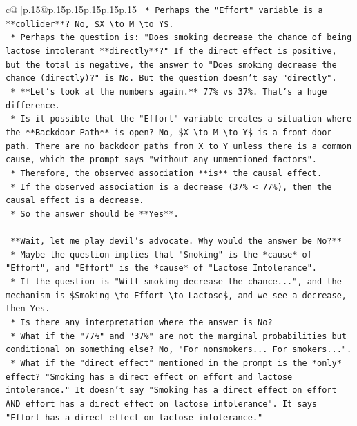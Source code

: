 \documentclass{article}
\begin{document}
{\begin{supertabular}{c@{$\;$}|p{.15\linewidth}@{}p{.15\linewidth}p{.15\linewidth}p{.15\linewidth}p{.15\linewidth}p{.15\linewidth}}
{{{\texttt{            *   Perhaps the "Effort" variable is a **collider**? No, \$X \textbackslash{}to M \textbackslash{}to Y\$.} \\
\texttt{            *   Perhaps the question is: "Does smoking decrease the chance of being lactose intolerant **directly**?" If the direct effect is positive, but the total is negative, the answer to "Does smoking decrease the chance (directly)?" is No. But the question doesn't say "directly".} \\
\texttt{            *   **Let's look at the numbers again.** 77\% vs 37\%. That's a huge difference.} \\
\texttt{            *   Is it possible that the "Effort" variable creates a situation where the **Backdoor Path** is open? No, \$X \textbackslash{}to M \textbackslash{}to Y\$ is a front{-}door path. There are no backdoor paths from X to Y unless there is a common cause, which the prompt says "without any unmentioned factors".} \\
\texttt{            *   Therefore, the observed association **is** the causal effect.} \\
\texttt{            *   If the observed association is a decrease (37\% < 77\%), then the causal effect is a decrease.} \\
\texttt{            *   So the answer should be **Yes**.} \\
\\ 
\texttt{    **Wait, let me play devil's advocate. Why would the answer be No?**} \\
\texttt{    *   Maybe the question implies that "Smoking" is the *cause* of "Effort", and "Effort" is the *cause* of "Lactose Intolerance".} \\
\texttt{    *   If the question is "Will smoking decrease the chance...", and the mechanism is \$Smoking \textbackslash{}to Effort \textbackslash{}to Lactose\$, and we see a decrease, then Yes.} \\
\texttt{    *   Is there any interpretation where the answer is No?} \\
\texttt{    *   What if the "77\%" and "37\%" are not the marginal probabilities but conditional on something else? No, "For nonsmokers... For smokers...".} \\
\texttt{    *   What if the "direct effect" mentioned in the prompt is the *only* effect? "Smoking has a direct effect on effort and lactose intolerance." It doesn't say "Smoking has a direct effect on effort AND effort has a direct effect on lactose intolerance". It says "Effort has a direct effect on lactose intolerance."} \\
}}}
\end{supertabular}}
\end{document}

